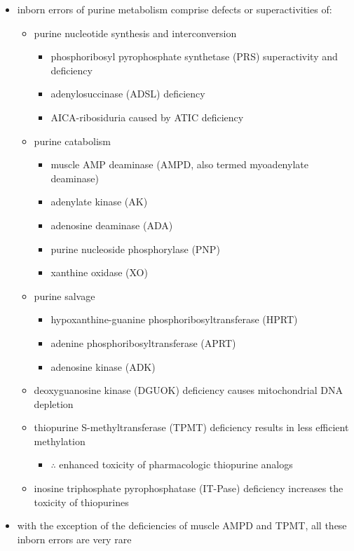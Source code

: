 \documentclass{scrartcl}
\begin{document}
\begin{itemize}
\item inborn errors of purine metabolism comprise defects or
superactivities of:

\begin{itemize}
\item purine nucleotide synthesis and interconversion
\begin{itemize}
\item phosphoribosyl pyrophosphate synthetase (PRS) superactivity and deficiency
\item adenylosuccinase (ADSL) deficiency
\item AICA-ribosiduria caused by ATIC deficiency
\end{itemize}
\item purine catabolism
\begin{itemize}
\item muscle AMP deaminase (AMPD, also termed myoadenylate deaminase)
\item adenylate kinase (AK)
\item adenosine deaminase (ADA)
\item purine nucleoside phosphorylase (PNP)
\item xanthine oxidase (XO)
\end{itemize}
\item purine salvage
\begin{itemize}
\item hypoxanthine-guanine phosphoribosyltransferase (HPRT)
\item adenine phosphoribosyltransferase (APRT)
\item adenosine kinase (ADK)
\end{itemize}
\item deoxyguanosine kinase (DGUOK) deficiency causes mitochondrial DNA depletion
\item thiopurine S-methyltransferase (TPMT) deficiency results in less
efficient methylation
\begin{itemize}
\item \(\therefore\) enhanced toxicity of pharmacologic thiopurine analogs
\end{itemize}
\item inosine triphosphate pyrophosphatase (IT-Pase) deficiency
increases the toxicity of thiopurines
\end{itemize}
\item with the exception of the deficiencies of muscle AMPD and TPMT, all
these inborn errors are very rare
\end{itemize}
\end{document}
